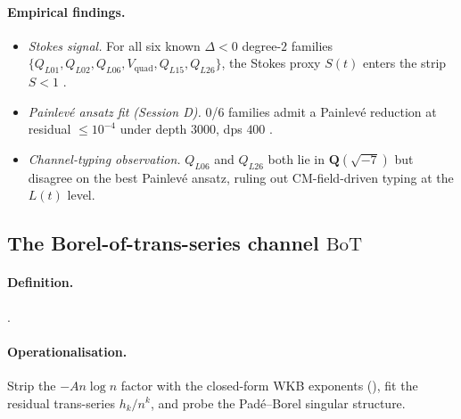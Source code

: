 \documentclass[11pt,reqno]{amsart}
\theoremstyle{plain}
\theoremstyle{definition}
\theoremstyle{remark}
\newcommand{\Lt}{L(t)}
\newcommand{\BoT}{\mathrm{BoT}}
\newcommand{\Vquad}{V_{\mathrm{quad}}}
\begin{document}
\paragraph{Empirical findings.}
\begin{itemize}
\item \emph{Stokes signal.} For all six known $\Delta<0$
degree-$2$ families
$\{Q_{L01}, Q_{L02}, Q_{L06}, \Vquad, Q_{L15}, Q_{L26}\}$,
the Stokes proxy $S(t)$ enters the strip $S<1$
\cite{siarc_pcf1_v13}.
\item \emph{Painlev\'e ansatz fit (Session D).} 0/6 families
admit a Painlev\'e reduction at residual $\le 10^{-4}$
under depth $3000$, dps $400$ \cite{siarc_painleve_deep_6x}.
\item \emph{Channel-typing observation.} $Q_{L06}$ and
$Q_{L26}$ both lie in $\mathbf{Q}(\sqrt{-7})$ but disagree
on the best Painlev\'e ansatz, ruling out CM-field-driven
typing at the $\Lt$ level.
\end{itemize}

\subsection{The Borel-of-trans-series channel $\BoT$}
\label{ssec:bot}

\paragraph{Definition.} .

\paragraph{Operationalisation.} Strip the $-A n \log n$
factor with the closed-form WKB exponents (),
fit the residual trans-series $h_k/n^k$, and probe the
Pad\'e--Borel singular structure.
\end{document}
